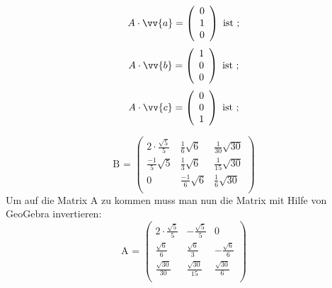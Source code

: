      $$A\cdot \vv{a}=\left(\begin{array}{c} 
     0\\1\\0\end{array}\right)\mbox{ ist ;} $$
     $$A\cdot \vv{b}=\left(\begin{array}{c} 
     1\\0\\0\end{array}\right)\mbox{ ist ;} $$
     $$A\cdot \vv{c}=\left(\begin{array}{c} 
     0\\0\\1\end{array}\right)\mbox{ ist ;} $$
     
$$\mbox{B = } \left(\begin{array}{ccc}
2\cdot\frac{\sqrt{5}}{5}&\frac{1}{6}\sqrt{6}&\frac{1}{30}\sqrt{30}\\
\frac{-1}{5}\sqrt{5}&\frac{1}{3}\sqrt{6}&\frac{1}{15}\sqrt{30}\\
0&\frac{-1}{6}\sqrt{6}&\frac{1}{6}\sqrt{30}\\
\end{array}\right)$$
Um auf die Matrix A zu kommen muss man nun die Matrix mit Hilfe von GeoGebra invertieren:
$$\mbox{A = }\left(\begin{array}{ccc}
2\cdot\frac{\sqrt{5}}{5}&-\frac{\sqrt{5}}{5}&0\\
\frac{\sqrt{6}}{6}&\frac{\sqrt{6}}{3}&-\frac{\sqrt{6}}{6}\\
\frac{\sqrt{30}}{30}&\frac{\sqrt{30}}{15}&\frac{\sqrt{30}}{6}\\
\end{array}\right)$$